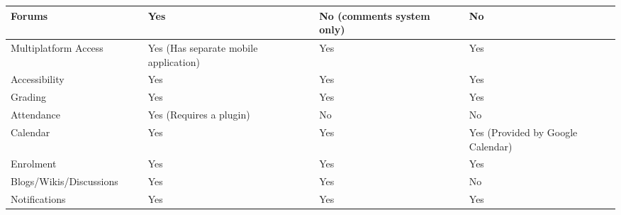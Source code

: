 \begin{table}[ht]
{\begin{tabular}{llllllll}
        \multicolumn{1}{|l|}{Forums}                      & \multicolumn{1}{l|}{} & \multicolumn{1}{l|}{} & \multicolumn{1}{l|}{Yes} & \multicolumn{1}{l|}{} & \multicolumn{1}{l|}{No (comments system only)} & \multicolumn{1}{l|}{} & \multicolumn{1}{l|}{No} \\ \hline
        \multicolumn{1}{|l|}{Multiplatform Access}        & \multicolumn{1}{l|}{} & \multicolumn{1}{l|}{} & \multicolumn{1}{l|}{Yes (Has separate mobile application)} & \multicolumn{1}{l|}{} & \multicolumn{1}{l|}{Yes}                       & \multicolumn{1}{l|}{} & \multicolumn{1}{l|}{Yes} \\ \hline
        \multicolumn{1}{|l|}{Accessibility}               & \multicolumn{1}{l|}{} & \multicolumn{1}{l|}{} & \multicolumn{1}{l|}{Yes} & \multicolumn{1}{l|}{} & \multicolumn{1}{l|}{Yes}                       & \multicolumn{1}{l|}{} & \multicolumn{1}{l|}{Yes} \\ \hline
        \multicolumn{1}{|l|}{Grading}                     & \multicolumn{1}{l|}{} & \multicolumn{1}{l|}{} & \multicolumn{1}{l|}{Yes} & \multicolumn{1}{l|}{} & \multicolumn{1}{l|}{Yes}                       & \multicolumn{1}{l|}{} & \multicolumn{1}{l|}{Yes} \\ \hline
        \multicolumn{1}{|l|}{Attendance}                  & \multicolumn{1}{l|}{} & \multicolumn{1}{l|}{} & \multicolumn{1}{l|}{Yes (Requires a plugin)} & \multicolumn{1}{l|}{} & \multicolumn{1}{l|}{No}                        & \multicolumn{1}{l|}{} & \multicolumn{1}{l|}{No} \\ \hline
        \multicolumn{1}{|l|}{Calendar}                    & \multicolumn{1}{l|}{} & \multicolumn{1}{l|}{} & \multicolumn{1}{l|}{Yes} & \multicolumn{1}{l|}{} & \multicolumn{1}{l|}{Yes}                       & \multicolumn{1}{l|}{} & \multicolumn{1}{l|}{Yes (Provided by Google Calendar)} \\ \hline
        \multicolumn{1}{|l|}{Enrolment}                   & \multicolumn{1}{l|}{} & \multicolumn{1}{l|}{} & \multicolumn{1}{l|}{Yes} & \multicolumn{1}{l|}{} & \multicolumn{1}{l|}{Yes}                       & \multicolumn{1}{l|}{} & \multicolumn{1}{l|}{Yes} \\ \hline
        \multicolumn{1}{|l|}{Blogs/Wikis/Discussions}     & \multicolumn{1}{l|}{} & \multicolumn{1}{l|}{} & \multicolumn{1}{l|}{Yes} & \multicolumn{1}{l|}{} & \multicolumn{1}{l|}{Yes}                       & \multicolumn{1}{l|}{} & \multicolumn{1}{l|}{No} \\ \hline
        \multicolumn{1}{|l|}{Notifications}               & \multicolumn{1}{l|}{} & \multicolumn{1}{l|}{} & \multicolumn{1}{l|}{Yes} & \multicolumn{1}{l|}{} & \multicolumn{1}{l|}{Yes}                       & \multicolumn{1}{l|}{} & \multicolumn{1}{l|}{Yes} \\ \hline

\end{tabular}}
\end{table}
